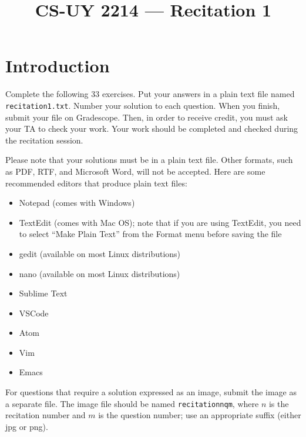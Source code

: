 \documentclass{article}
\title{CS-UY 2214 — Recitation 1}
\date{}
\begin{document}
\maketitle

\section*{Introduction}
Complete the following 33 exercises. Put your answers in a plain text file named \texttt{recitation1.txt}. Number your solution to each question. When you finish, submit your file on Gradescope. Then, in order to receive credit, you must ask your TA to check your work. Your work should be completed and checked during the recitation session.

Please note that your solutions must be in a plain text file. Other formats, such as PDF, RTF, and Microsoft Word, will not be accepted. Here are some recommended editors that produce plain text files:
\begin{itemize}
    \item Notepad (comes with Windows)
    \item TextEdit (comes with Mac OS); note that if you are using TextEdit, you need to select “Make Plain Text” from the Format menu before saving the file
    \item gedit (available on most Linux distributions)
    \item nano (available on most Linux distributions)
    \item Sublime Text
    \item VSCode
    \item Atom
    \item Vim
    \item Emacs
\end{itemize}

For questions that require a solution expressed as an image, submit the image as a separate file. The image file should be named \texttt{recitationnqm}, where $n$ is the recitation number and $m$ is the question number; use an appropriate suffix (either jpg or png).
\end{document}
